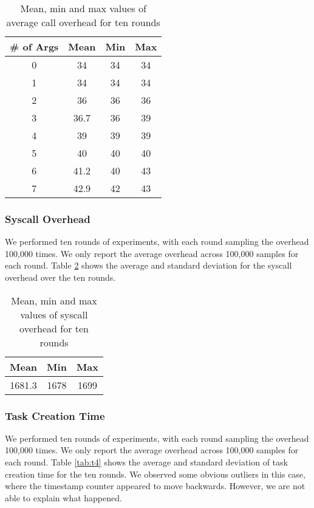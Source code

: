 \begin{table}[htb]

\caption{Mean, min and max values of average call overhead for ten rounds}

    \begin{tabular}{|c|c|c|c|} 
     \hline
     \# of Args & Mean & Min & Max \\ 
     \hline
     0 & 34 & 34 & 34 \\ 
     \hline
     1 & 34 & 34 & 34 \\ 
     \hline
     2 & 36 & 36 & 36 \\ 
     \hline
     3 & 36.7 & 36 & 39 \\ 
     \hline
     4 & 39 & 39 & 39 \\ 
     \hline
     5 & 40 & 40 & 40 \\ 
     \hline
     6 & 41.2 & 40 & 43 \\ 
     \hline
     7 & 42.9 & 42 & 43 \\ 
     \hline
    \end{tabular}
    \label{tab:t2}
\end{table}


\subsubsection{Syscall Overhead}
We performed ten rounds of experiments, with each round sampling the
overhead 100,000 times.
%
We only report the average overhead across 100,000 samples for each
round.
%
Table \ref{tab:t3} shows the average and standard deviation for the
syscall overhead over the ten rounds.

\begin{table}[tb]

    \caption{Mean, min and max values of syscall overhead for ten rounds}
    
    \begin{tabular}{|c|c|c|} 
        \hline
        Mean & Min & Max \\ 
        \hline
        1681.3 & 1678 & 1699 \\ 
        \hline
       \end{tabular}
        \label{tab:t3}
\end{table}

    
\subsubsection{Task Creation Time}
\label{subsubsec:tct}
We performed ten rounds of experiments, with each round sampling the
overhead 100,000 times. %
We only report the average overhead across 100,000 samples for each
round. %
Table \ref{tab:t4} shows the average and standard deviation of task
creation time for the ten rounds. %
We observed some obvious outliers in this case, where the timestamp
counter appeared to move backwards. %
However, we are not able to explain what happened.


